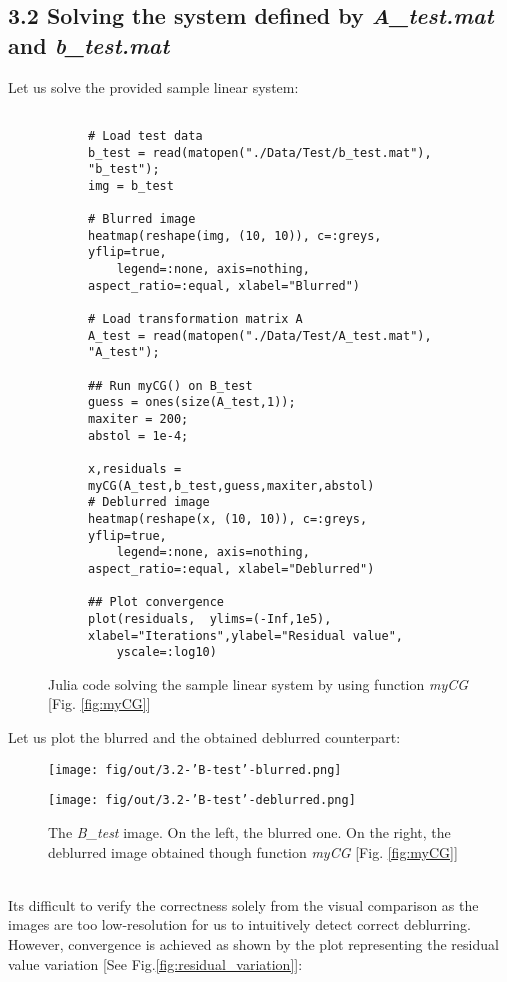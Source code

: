 \documentclass[unicode,11pt,a4paper,oneside,numbers=endperiod,openany]{scrartcl}
\begin{document}
\subsection*{3.2 Solving the system deﬁned by  \textit{A\_test.mat} and \textit{b\_test.mat}}
Let us solve the provided sample linear system: %
\begin{figure}[H]
    \begin{subfigure}[l]{\textwidth}
\begin{verbatim}

# Load test data
b_test = read(matopen("./Data/Test/b_test.mat"), "b_test");
img = b_test

# Blurred image
heatmap(reshape(img, (10, 10)), c=:greys, yflip=true,
    legend=:none, axis=nothing, aspect_ratio=:equal, xlabel="Blurred")

# Load transformation matrix A
A_test = read(matopen("./Data/Test/A_test.mat"), "A_test");

## Run myCG() on B_test
guess = ones(size(A_test,1));
maxiter = 200;
abstol = 1e-4;

x,residuals = myCG(A_test,b_test,guess,maxiter,abstol)
# Deblurred image
heatmap(reshape(x, (10, 10)), c=:greys, yflip=true, 
    legend=:none, axis=nothing, aspect_ratio=:equal, xlabel="Deblurred")

## Plot convergence
plot(residuals,  ylims=(-Inf,1e5), xlabel="Iterations",ylabel="Residual value",
    yscale=:log10)
\end{verbatim}
    \end{subfigure}
    \caption{Julia code solving the sample linear system by using function \textit{myCG} [Fig. \ref{fig:myCG}]}
    \label{fig:solveLinearEq}
\end{figure}

Let us plot the blurred and the obtained deblurred counterpart:
\begin{figure}[!h]
    \begin{minipage}{0.5\textwidth}
        \centering
        \texttt{[image: fig/out/3.2-'B-test'-blurred.png]}
    \end{minipage}
        \begin{minipage}{0.5\textwidth}
        \centering
        \texttt{[image: fig/out/3.2-'B-test'-deblurred.png]}
    \end{minipage}
    \caption{The \textit{B\_test} image. On the left, the blurred one. On the right, the deblurred image obtained though function \textit{myCG} [Fig. \ref{fig:myCG}]}
\end{figure}\\
Its difficult to verify the correctness solely from the visual comparison as the images are too low-resolution for us to intuitively detect correct deblurring. However, convergence is achieved as shown by the plot representing the residual value variation [See Fig.\ref{fig:residual_variation}]:
\end{document}
